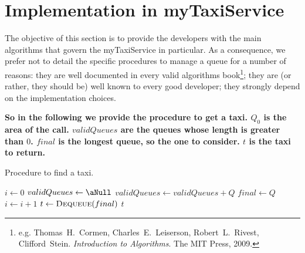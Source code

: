 \section{Implementation in myTaxiService}
The objective of this section is to provide the developers with the main algorithms that govern the myTaxiService in particular. As a consequence, we prefer not to detail the  specific procedures to manage a queue for a number of reasons: they are well documented in every valid algorithms book\footnote{e.g. Thomas~H.~Cormen, Charles~E.~Leiserson, Robert~L.~Rivest, Clifford~Stein. \emph{Introduction to Algorithms}. The MIT Press, 2009.}; they are (or rather, they should be) well known to every good developer; they strongly depend on the implementation choices. 

{\textbf{So in the following we provide the procedure to get a taxi. $Q_0$ is the area of the call. $validQueues$ are the queues whose length is greater than $0$. $final$ is the longest queue, so the one to consider. $t$ is the taxi to return.}} %

\begin{algorithm}
\caption{Procedure to find a taxi.} \label{alg:getTaxi}
\begin{algorithmic}[1]
	\State $i \gets 0$
	\Repeat
		\State $validQueues \gets \aNull$
				\State $validQueues \gets validQueues + Q$
			\EndIf
		\EndFor
				\State $final \gets Q$
			\EndIf
		\EndFor
		\State $i \gets i + 1$
	\State $t \gets \Call{Dequeue}{final}$
	\State \Return $t$ 
\EndProcedure
\end{algorithmic}
\end{algorithm}







